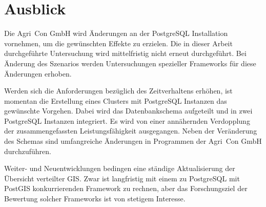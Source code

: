 \section{Ausblick}
Die Agri~Con GmbH wird Änderungen an der PostgreSQL Installation vornehmen, um die gewünschten Effekte zu erzielen.
Die in dieser Arbeit durchgeführte Untersuchung wird mittelfristig nicht erneut durchgeführt.
Bei Änderung des Szenarios werden Untersuchungen spezieller Frameworks für diese Änderungen erhoben.

Werden sich die Anforderungen bezüglich des Zeitverhaltens erhöhen, ist momentan die Erstellung eines Clusters mit PostgreSQL Instanzen das gewünschte Vorgehen.
Dabei wird das Datenbankschema aufgeteilt und in zwei PostgreSQL Instanzen integriert.
Es wird von einer annähernden Verdopplung der zusammengefassten Leistungsfähigkeit ausgegangen.
Neben der Veränderung des Schemas sind umfangreiche Änderungen in Programmen der Agri~Con GmbH durchzuführen.

Weiter- und Neuentwicklungen bedingen eine ständige Aktualisierung der Übersicht verteilter GIS.
Zwar ist langfristig mit einem zu PostgreSQL mit PostGIS konkurrierenden Framework zu rechnen, aber das Forschungsziel der Bewertung solcher Frameworks ist von stetigem Interesse.


\label{LastPage}